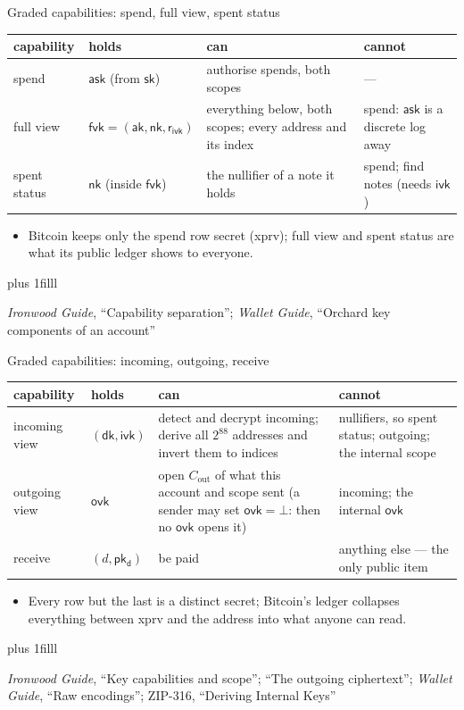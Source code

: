 \documentclass[aspectratio=169,11pt]{beamer}
\newcommand{\pkd}{\ensuremath{\mathsf{pk_d}}}
\newcommand{\aksym}{\ensuremath{\mathsf{ak}}}
\newcommand{\nksym}{\ensuremath{\mathsf{nk}}}
\newcommand{\asksym}{\ensuremath{\mathsf{ask}}}
\newcommand{\ivk}{\ensuremath{\mathsf{ivk}}}
\newcommand{\fvk}{\ensuremath{\mathsf{fvk}}}
\newcommand{\ovk}{\ensuremath{\mathsf{ovk}}}
\newcommand{\dk}{\ensuremath{\mathsf{dk}}}
\newcommand{\rivk}{\ensuremath{\mathsf{r_{ivk}}}}
\newcommand{\src}[1]{\par\vskip0pt plus 1filll
  {\fontsize{6}{7.2}\selectfont\color{arbdim}\raggedright #1\par}}
\begin{document}
\begin{frame}{Graded capabilities: spend, full view, spent status}
\begin{center}\small
\begin{tabular}{@{}llp{42mm}p{34mm}@{}}
\toprule
capability & holds & can & cannot \\
\midrule
spend & \asksym{} (from $\mathsf{sk}$)
  & authorise spends, both scopes & --- \\
full view & $\fvk = (\aksym, \nksym, \rivk)$
  & everything below, both scopes; every address and its index
  & spend: \asksym{} is a discrete log away \\
spent status & \nksym{} (inside \fvk)
  & the nullifier of a note it holds
  & spend; find notes (needs \ivk) \\
\bottomrule
\end{tabular}
\end{center}
\begin{itemize}
  \item Bitcoin keeps only the spend row secret (xprv); full view and
    spent status are what its public ledger shows to everyone.
\end{itemize}
\src{\emph{Ironwood Guide}, ``Capability separation''; \emph{Wallet Guide},
``Orchard key components of an account''}
\end{frame}

\begin{frame}{Graded capabilities: incoming, outgoing, receive}
\begin{center}\small
\begin{tabular}{@{}llp{50mm}p{40mm}@{}}
\toprule
capability & holds & can & cannot \\
\midrule
incoming view & $(\dk, \ivk)$
  & detect and decrypt incoming; derive all $2^{88}$ addresses and
    invert them to indices
  & nullifiers, so spent status; outgoing; the internal scope \\
outgoing view & \ovk
  & open $C_{\mathrm{out}}$ of what this account and scope sent (a sender
    may set $\ovk = \bot$: then no \ovk{} opens it)
  & incoming; the internal \ovk \\
receive & $(d, \pkd)$
  & be paid & anything else --- the only public item \\
\bottomrule
\end{tabular}
\end{center}
\begin{itemize}
  \item Every row but the last is a distinct secret; Bitcoin's ledger
    collapses everything between xprv and the address into what anyone can
    read.
\end{itemize}
\src{\emph{Ironwood Guide}, ``Key capabilities and scope''; ``The outgoing
ciphertext''; \emph{Wallet Guide}, ``Raw encodings''; ZIP-316, ``Deriving
Internal Keys''}
\end{frame}
\end{document}
